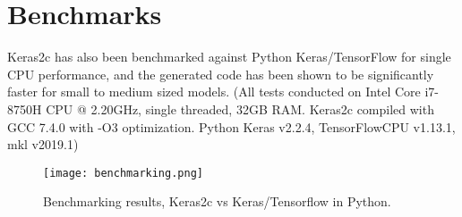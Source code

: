 \documentclass{article}
\begin{document}
\section*{Benchmarks}\label{benchmarks}

Keras2c has also been benchmarked against Python Keras/TensorFlow for
single CPU performance, and the generated code has been shown to be
significantly faster for small to medium sized models. (All tests
conducted on Intel Core i7-8750H CPU @ 2.20GHz, single threaded, 32GB
RAM. Keras2c compiled with GCC 7.4.0 with -O3 optimization. Python Keras
v2.2.4, TensorFlowCPU v1.13.1, mkl v2019.1)

\begin{figure}[h]
\centering
\texttt{[image: benchmarking.png]}
\caption{Benchmarking results, Keras2c vs Keras/Tensorflow in Python.}
\end{figure}
\end{document}
